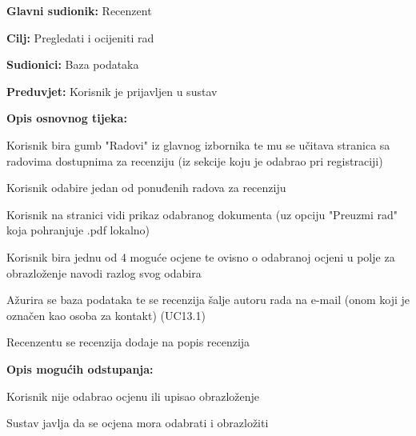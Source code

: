 				
					\noindent {}
					\begin{packed_item}
						
						\item \textbf{Glavni sudionik:} Recenzent
						\item \textbf{Cilj:} Pregledati i ocijeniti rad
						\item \textbf{Sudionici:} Baza podataka
						\item \textbf{Preduvjet:} Korisnik je prijavljen u sustav
						\item \textbf{Opis osnovnog tijeka:} 
						
						\item[] \begin{packed_enum}
							
							\item Korisnik bira gumb "Radovi" iz glavnog izbornika te mu se učitava stranica sa radovima dostupnima za recenziju (iz sekcije koju je odabrao pri registraciji)
							\item Korisnik odabire jedan od ponuđenih radova za recenziju
							\item  Korisnik na stranici vidi prikaz odabranog dokumenta (uz opciju "Preuzmi rad" koja pohranjuje .pdf lokalno)
							\item Korisnik bira jednu od 4 moguće ocjene te ovisno o odabranoj ocjeni u polje za obrazloženje navodi razlog svog odabira
							\item Ažurira se baza podataka te se recenzija šalje autoru rada na e-mail  (onom koji je označen kao osoba za kontakt) (UC13.1)
							\item Recenzentu se recenzija dodaje na popis recenzija
							
							
						\end{packed_enum}
						
						\item \textbf{Opis mogućih odstupanja:}
						
						\item[] \begin{packed_enum}
							\item[4.a] Korisnik nije odabrao ocjenu ili upisao obrazloženje
							\item[] \begin{packed_enum}
								\item[1.] Sustav javlja da se ocjena mora odabrati i obrazložiti
							\end{packed_enum}
							

\end{packed_enum}
\end{packed_item}

